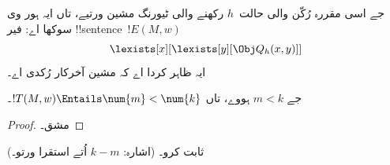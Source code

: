 \documentclass[../../../include/open-logic-section]{subfiles}
\begin{document}
جے اسی مقررہ رُکّن والی حالت~$h$ رکھنے والی ٹیورنگ
مشین ورتیے، تاں ایہ ہور وی سوکھا اے: فیر
!!{sentence}~$!E(M, w)$
\[
\lexists[x][\lexists[y][\Obj Q_h(x, y)]]
\]
ایہ ظاہر کردا اے کہ مشین آخرکار رُکدی اے۔

\begin{prop}
جے $m < k$ ہووے، تاں $!T(M, w) \Entails \num{m} < \num{k}$۔
\end{prop}

\begin{proof}
مشق۔
\end{proof}

\begin{prob}
 ثابت کرو۔
(اشارہ: $k-m$ اُتے استقرا ورتو۔)
\end{prob}
\end{document}

